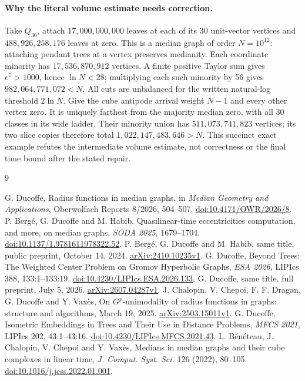 \documentclass[11pt]{article}
\begin{document}
\paragraph{Why the literal volume estimate needs correction.}
Take $Q_{30}$, attach $17{,}000{,}000{,}000$ leaves at each of its
30 unit-vector vertices and $488{,}926{,}258{,}176$ leaves at zero.
This is a median graph of order $N=10^{12}$: attaching pendant trees
at a vertex preserves medianity. Each coordinate minority has
$17{,}536{,}870{,}912$ vertices. A finite positive Taylor sum gives
$e^7>1000$, hence $\ln N<28$; multiplying each such minority by
56 gives $982{,}064{,}771{,}072<N$. All cuts are unbalanced for the
written natural-log threshold $2\ln N$. Give the cube antipode arrival
weight $N-1$ and every other vertex zero. It is uniquely farthest from
the majority median zero, with all 30 classes in its wide ladder.
Their minority union has $511{,}073{,}741{,}823$ vertices; its two
slice copies therefore total $1{,}022{,}147{,}483{,}646>N$.
This succinct exact example refutes the intermediate volume estimate,
not correctness or the final time bound after the stated repair.

\begin{thebibliography}{9}
\raggedright
{} G. Ducoffe, Radius functions in median graphs, in
\emph{Median Geometry and Applications}, Oberwolfach Reports 8/2026,
504--507. \href{https://doi.org/10.4171/OWR/2026/8}{doi:10.4171/OWR/2026/8}.
 P. Berg\'e, G. Ducoffe and M. Habib,
Quasilinear-time eccentricities computation, and more, on median graphs,
\emph{SODA 2025}, 1679--1704.
\href{https://doi.org/10.1137/1.9781611978322.52}{doi:10.1137/1.9781611978322.52}.
 P. Berg\'e, G. Ducoffe and M. Habib, same title,
public preprint, October 14, 2024.
\href{https://arxiv.org/abs/2410.10235v1}{arXiv:2410.10235v1}.
 G. Ducoffe, Beyond Trees: The Weighted Center Problem on
Gromov Hyperbolic Graphs, \emph{ESA 2026}, LIPIcs 388, 133:1--133:19.
\href{https://doi.org/10.4230/LIPIcs.ESA.2026.133}{doi:10.4230/LIPIcs.ESA.2026.133}.
 G. Ducoffe, same title, full preprint, July 5, 2026.
\href{https://arxiv.org/abs/2607.04287v1}{arXiv:2607.04287v1}.
 J. Chalopin, V. Chepoi, F. F. Dragan, G. Ducoffe and
Y. Vax\`es, On $G^p$-unimodality of radius functions in graphs:
structure and algorithms, March 19, 2025.
\href{https://arxiv.org/abs/2503.15011v1}{arXiv:2503.15011v1}.
 G. Ducoffe, Isometric Embeddings in Trees and Their Use
in Distance Problems, \emph{MFCS 2021}, LIPIcs 202, 43:1--43:16.
\href{https://doi.org/10.4230/LIPIcs.MFCS.2021.43}{doi:10.4230/LIPIcs.MFCS.2021.43}.
 L. B\'en\'eteau, J. Chalopin, V. Chepoi and Y. Vax\`es,
Medians in median graphs and their cube complexes in linear time,
\emph{J. Comput. Syst. Sci.} 126 (2022), 80--105.
\href{https://doi.org/10.1016/j.jcss.2022.01.001}{doi:10.1016/j.jcss.2022.01.001}.
\end{thebibliography}
\end{document}
